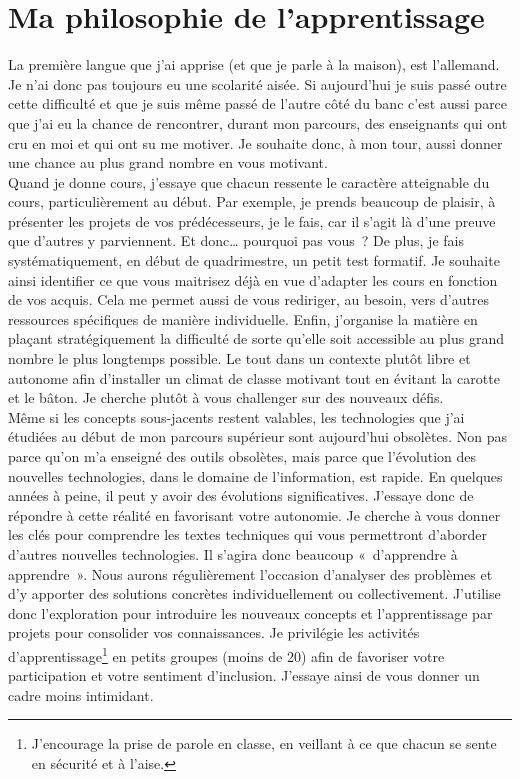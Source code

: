 \clearpage
\section{Ma philosophie de l'apprentissage}

La première langue que j'ai apprise (et que je parle à la maison), est l'allemand. Je n'ai donc pas toujours eu une scolarité aisée. Si aujourd'hui je suis passé outre cette difficulté et que je suis même passé de l'autre côté du banc c'est aussi parce que j'ai eu la chance de rencontrer, durant mon parcours, des enseignants qui ont cru en moi et qui ont su me motiver. Je souhaite donc, à mon tour, aussi donner une chance au plus grand nombre en vous motivant.\\

Quand je donne cours, j’essaye que chacun ressente le caractère atteignable du cours, particulièrement au début. Par exemple, je prends beaucoup de plaisir, à présenter les projets de vos prédécesseurs, je le fais, car il s’agit là d’une preuve que d’autres y parviennent. Et donc… pourquoi pas vous~? De plus, je fais systématiquement, en début de quadrimestre, un petit test formatif. Je souhaite ainsi identifier ce que vous maitrisez déjà en vue d’adapter les cours en fonction de vos acquis. Cela me permet aussi de vous rediriger, au besoin, vers d'autres ressources spécifiques de manière individuelle. Enfin, j'organise la matière en plaçant stratégiquement la difficulté de sorte qu'elle soit accessible au plus grand nombre le plus longtemps possible. Le tout dans un contexte plutôt libre et autonome afin d'installer un climat de classe motivant tout en évitant la carotte et le bâton. Je cherche plutôt à vous challenger sur des nouveaux défis.\\

Même si les concepts sous-jacents restent valables, les technologies que j'ai étudiées au début de mon parcours supérieur sont aujourd'hui obsolètes. Non pas parce qu'on m'a enseigné des outils obsolètes, mais parce que l'évolution des nouvelles technologies, dans le domaine de l'information, est rapide. En quelques années à peine, il peut y avoir des évolutions significatives. J’essaye donc de répondre à cette réalité en favorisant votre autonomie. Je cherche à vous donner les clés pour comprendre les textes techniques qui vous permettront d’aborder d’autres nouvelles technologies. Il s’agira donc beaucoup «~d’apprendre à apprendre~». Nous aurons régulièrement l’occasion d’analyser des problèmes et d’y apporter des solutions concrètes individuellement ou collectivement. J’utilise donc l'exploration pour introduire les nouveaux concepts et l’apprentissage par projets pour consolider vos connaissances. Je privilégie les activités d’apprentissage\footnote{J'encourage la prise de parole en classe, en veillant à ce que chacun se sente en sécurité et à l'aise.} en petits groupes (moins de 20) afin de favoriser votre participation et votre sentiment d’inclusion. J’essaye ainsi de vous donner un cadre moins intimidant.


